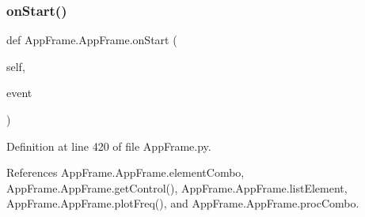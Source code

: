 \subsubsection{\texorpdfstring{on\+Start()}{onStart()}}
{\footnotesize\ttfamily def App\+Frame.\+App\+Frame.\+on\+Start (\begin{DoxyParamCaption}\item[{}]{self,  }\item[{}]{event }\end{DoxyParamCaption})}



Definition at line 420 of file App\+Frame.\+py.



References App\+Frame.\+App\+Frame.\+element\+Combo, App\+Frame.\+App\+Frame.\+get\+Control(), App\+Frame.\+App\+Frame.\+list\+Element, App\+Frame.\+App\+Frame.\+plot\+Freq(), and App\+Frame.\+App\+Frame.\+proc\+Combo.


